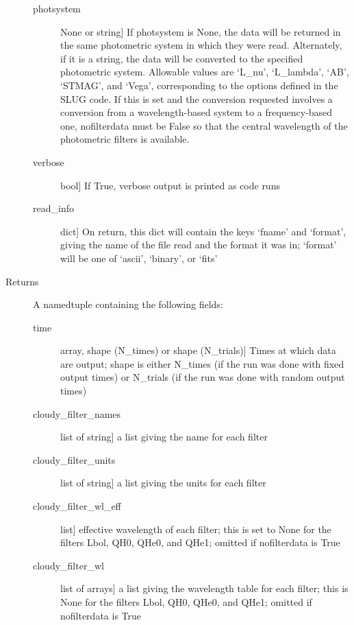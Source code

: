 \documentclass[letterpaper,10pt,english]{sphinxmanual}
\begin{document}
\begin{fulllineitems}
\begin{description}
\begin{description}
\item[{photsystem}] \leavevmode{[}None or string{]}
If photsystem is None, the data will be returned in the same
photometric system in which they were read. Alternately, if it
is a string, the data will be converted to the specified
photometric system. Allowable values are `L\_nu', `L\_lambda',
`AB', `STMAG', and `Vega', corresponding to the options defined
in the SLUG code. If this is set and the conversion requested
involves a conversion from a wavelength-based system to a
frequency-based one, nofilterdata must be False so that the
central wavelength of the photometric filters is available.

\item[{verbose}] \leavevmode{[}bool{]}
If True, verbose output is printed as code runs

\item[{read\_info}] \leavevmode{[}dict{]}
On return, this dict will contain the keys `fname' and
`format', giving the name of the file read and the format it
was in; `format' will be one of `ascii', `binary', or `fits'

\end{description}

\item[{Returns}] \leavevmode
A namedtuple containing the following fields:
\begin{description}
\item[{time}] \leavevmode{[}array, shape (N\_times) or shape (N\_trials){]}
Times at which data are output; shape is either N\_times (if
the run was done with fixed output times) or N\_trials (if
the run was done with random output times)

\item[{cloudy\_filter\_names}] \leavevmode{[}list of string{]}
a list giving the name for each filter

\item[{cloudy\_filter\_units}] \leavevmode{[}list of string{]}
a list giving the units for each filter

\item[{cloudy\_filter\_wl\_eff}] \leavevmode{[}list{]}
effective wavelength of each filter; this is set to None for the
filters Lbol, QH0, QHe0, and QHe1; omitted if nofilterdata is
True

\item[{cloudy\_filter\_wl}] \leavevmode{[}list of arrays{]}
a list giving the wavelength table for each filter; this is
None for the filters Lbol, QH0, QHe0, and QHe1; omitted if
nofilterdata is True


\end{description}
\end{description}
\end{fulllineitems}
\end{document}
